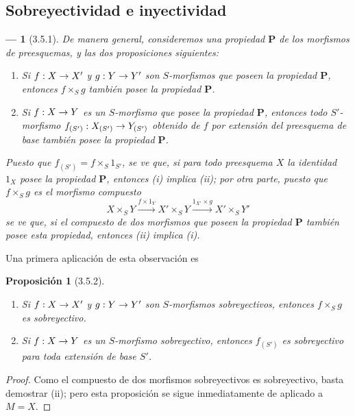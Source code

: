 \documentclass[oneside]{amsart}
\theoremstyle{ega-env-style}
\newtheorem*{env}{---}
\theoremstyle{ega-thm-env-style}
\newtheorem*{proposition}{Proposición}
\theoremstyle{ega-defn-env-style}
\renewcommand{\to}{\mathchoice{\longrightarrow}{\rightarrow}{\rightarrow}{\rightarrow}}
\newcommand{\oldpage}[2][]{{\marginnote{\normalfont{\textbf{#1}~|~#2}}}\ignorespaces}
\let\EGAOriginalLabel\label
\renewcommand{\label}[1]{\phantomsection\EGAOriginalLabel{#1}}
\begin{document}
\subsection{Sobreyectividad e inyectividad}
\label{subsection:I.3.5}

\begin{env}[3.5.1]
\label{I.3.5.1}
De manera general, consideremos una propiedad $\boldsymbol{P}$ de los morfismos de preesquemas, y las dos proposiciones siguientes:
\begin{enumerate}
  \item[\textup{(i)}] \itshape Si $f:X\to X'$ y $g:Y\to Y'$ son $S$-morfismos que poseen la propiedad $\boldsymbol{P}$, entonces $f\times_S g$ también posee la propiedad $\boldsymbol{P}$.
  \upshape\item[\textup{(ii)}] \itshape Si $f:X\to Y$ es un $S$-morfismo que posee la propiedad $\boldsymbol{P}$, entonces todo $S'$-morfismo $f_{(S')}:X_{(S')}\to Y_{(S')}$ obtenido de $f$ por extensión del preesquema de base también posee la propiedad $\boldsymbol{P}$.
\end{enumerate}

\oldpage[I]{115}Puesto que $f_{(S')}=f\times_S 1_{S'}$, se ve que, si para todo preesquema $X$ la \emph{identidad} $1_X$ posee la propiedad $\boldsymbol{P}$, entonces (i) implica (ii); por otra parte, puesto que $f\times_S g$ es el morfismo compuesto
\label{I.3.5.1.product-composition-fr}
\[
  X\times_S Y\xrightarrow{f\times 1_Y}X'\times_S Y
  \xrightarrow{1_{X'}\times g}X'\times_S Y'
\]
se ve que, si el \emph{compuesto} de dos morfismos que poseen la propiedad $\boldsymbol{P}$ también posee esta propiedad, entonces (ii) implica (i).
\end{env}

Una primera aplicación de esta observación es
\begin{proposition}[3.5.2]
\label{I.3.5.2}
\medskip\noindent
\begin{enumerate}
  \item[{\rm(i)}] Si $f:X\to X'$ y $g:Y\to Y'$ son $S$-morfismos sobreyectivos, entonces $f\times_S g$ es sobreyectivo.
  \item[{\rm(ii)}] Si $f:X\to Y$ es un $S$-morfismo sobreyectivo, entonces $f_{(S')}$ es sobreyectivo para toda extensión de base $S'$.
\end{enumerate}
\end{proposition}

\begin{proof}
Como el compuesto de dos morfismos sobreyectivos es sobreyectivo, basta demostrar (ii); pero esta proposición se sigue inmediatamente de  aplicado a $M=X$.
\end{proof}
\end{document}
